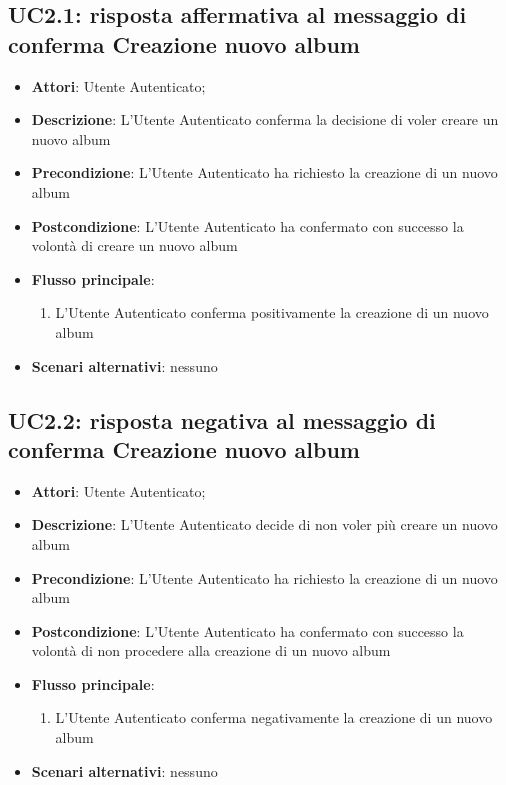
\subsection{UC2.1: risposta affermativa al messaggio di conferma Creazione
nuovo album}
\label{uc:uc2.1}

\begin{itemize}
  \item \textbf{Attori}: Utente Autenticato;
  \item \textbf{Descrizione}: L'Utente Autenticato conferma la decisione di
voler creare un nuovo album
  \item \textbf{Precondizione}: L'Utente Autenticato ha richiesto la creazione
di un nuovo album
  \item \textbf{Postcondizione}: L'Utente Autenticato ha confermato con
successo la volontà di creare un nuovo album
  \item \textbf{Flusso principale}:
  \begin{enumerate}
    \item L'Utente Autenticato conferma positivamente la creazione di un nuovo
album
  \end{enumerate}
  \item \textbf{Scenari alternativi}: nessuno
\end{itemize}



\subsection{UC2.2: risposta negativa al messaggio di conferma Creazione nuovo
album}
\label{uc:uc2.2}

\begin{itemize}
  \item \textbf{Attori}: Utente Autenticato;
  \item \textbf{Descrizione}: L'Utente Autenticato decide di non voler più
creare un nuovo album
  \item \textbf{Precondizione}: L'Utente Autenticato ha richiesto la creazione
di un nuovo album
  \item \textbf{Postcondizione}: L'Utente Autenticato ha confermato con
successo la volontà di non procedere alla creazione di un nuovo album
  \item \textbf{Flusso principale}:
  \begin{enumerate}
    \item L'Utente Autenticato conferma negativamente la creazione di un nuovo
album
  \end{enumerate}
  \item \textbf{Scenari alternativi}: nessuno
\end{itemize}


